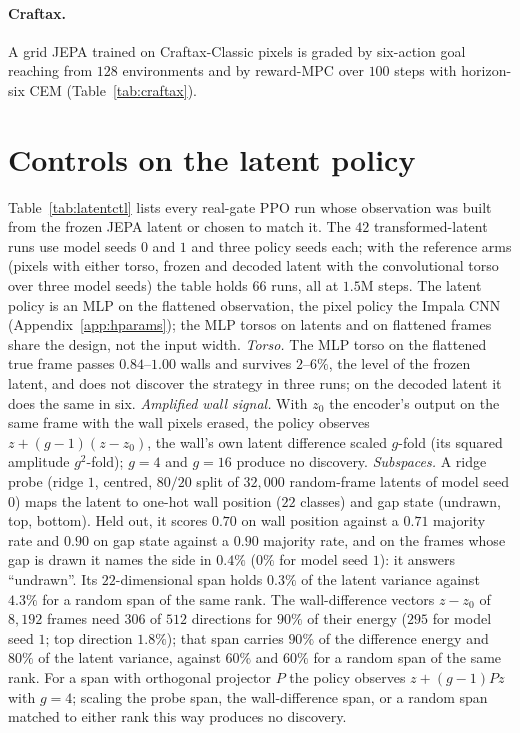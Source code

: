 \paragraph{Craftax.} A grid JEPA trained on Craftax-Classic pixels is graded by six-action goal
reaching from $128$ environments and by reward-MPC over $100$ steps with horizon-six CEM
(Table~\ref{tab:craftax}).
\label{app:craftax}

\begin{table}[ht]
\centering
\caption{Craftax-Classic results with the grid JEPA and post-hoc heads.}
\label{tab:craftax}
\vspace{0.2em}
\end{table}

\section{Controls on the latent policy}
\label{app:latentctl}

Table~\ref{tab:latentctl} lists every real-gate PPO run whose observation was built from the frozen JEPA latent or chosen to match it. The $42$ transformed-latent runs use model seeds $0$ and $1$ and three policy seeds each; with the reference arms (pixels with either torso, frozen and decoded latent with the convolutional torso over three model seeds) the table holds $66$ runs, all at $1.5$M steps. The latent policy is an MLP on the flattened observation, the pixel policy the Impala CNN (Appendix~\ref{app:hparams}); the MLP torsos on latents and on flattened frames share the design, not the input width. \emph{Torso.} The MLP torso on the flattened true frame passes $0.84$--$1.00$ walls and survives $2$--$6\%$, the level of the frozen latent, and does not discover the strategy in three runs; on the decoded latent it does the same in six. \emph{Amplified wall signal.} With $z_0$ the encoder's output on the same frame with the wall pixels erased, the policy observes $z + (g-1)(z - z_0)$, the wall's own latent difference scaled $g$-fold (its squared amplitude $g^2$-fold); $g=4$ and $g=16$ produce no discovery. \emph{Subspaces.} A ridge probe (ridge $1$, centred, $80/20$ split of $32{,}000$ random-frame latents of model seed $0$) maps the latent to one-hot wall position ($22$ classes) and gap state (undrawn, top, bottom). Held out, it scores $0.70$ on wall position against a $0.71$ majority rate and $0.90$ on gap state against a $0.90$ majority rate, and on the frames whose gap is drawn it names the side in $0.4\%$ ($0\%$ for model seed $1$): it answers ``undrawn''. Its $22$-dimensional span holds $0.3\%$ of the latent variance against $4.3\%$ for a random span of the same rank. The wall-difference vectors $z-z_0$ of $8{,}192$ frames need $306$ of $512$ directions for $90\%$ of their energy ($295$ for model seed $1$; top direction $1.8\%$); that span carries $90\%$ of the difference energy and $80\%$ of the latent variance, against $60\%$ and $60\%$ for a random span of the same rank. For a span with orthogonal projector $P$ the policy observes $z + (g-1)Pz$ with $g=4$; scaling the probe span, the wall-difference span, or a random span matched to either rank this way produces no discovery.

